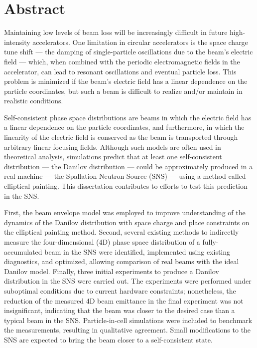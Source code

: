 \chapter*{Abstract} 

Maintaining low levels of beam loss will be increasingly difficult in future high-intensity accelerators. One limitation in circular accelerators is the space charge tune shift — the damping of single-particle oscillations due to the beam's electric field — which, when combined with the periodic electromagnetic fields in the accelerator, can lead to resonant oscillations and eventual particle loss. This problem is minimized if the beam's electric field has a linear dependence on the particle coordinates, but such a beam is difficult to realize and/or maintain in realistic conditions.

Self-consistent phase space distributions are beams in which the electric field has a linear dependence on the particle coordinates, and furthermore, in which the linearity of the electric field is conserved as the beam is transported through arbitrary linear focusing fields. Although such models are often used in theoretical analysis, simulations predict that at least one self-consistent distribution — the Danilov distribution — could be approximately produced in a real machine — the Spallation Neutron Source (SNS) — using a method called elliptical painting. This dissertation contributes to efforts to test this prediction in the SNS. 

First, the beam envelope model was employed to improve understanding of the dynamics of the Danilov distribution with space charge and place constraints on the elliptical painting method. Second, several existing methods to indirectly measure the four-dimensional (4D) phase space distribution of a fully-accumulated beam in the SNS were identified, implemented using existing diagnostics, and optimized, allowing comparison of real beams with the ideal Danilov model. Finally, three initial experiments to produce a Danilov distribution in the SNS were carried out. The experiments were performed under suboptimal conditions due to current hardware constraints; nonetheless, the reduction of the measured 4D beam emittance in the final experiment was not insignificant, indicating that the beam was closer to the desired case than a typical beam in the SNS. Particle-in-cell simulations were included to benchmark the measurements, resulting in qualitative agreement. Small modifications to the SNS are expected to bring the beam closer to a self-consistent state.